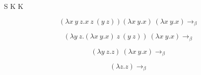 \documentclass{article}[14pt]
\begin{document}
S K K 

$$ (\lambda x \ y \ z. x \ z \ (y \ z)) (\lambda x \ y. x) \ (\lambda x \ y. x) \to_\beta $$ 

$$ (\lambda y \ z.  (\lambda x \ y. x) \ z  \  (y \ z)) \ (\lambda x \ y. x) \to_\beta $$ 

$$ (\lambda y \ z.  z) \ (\lambda x \ y. x) \to_\beta $$

$$ (\lambda z.  z) \to_\beta $$
\end{document}

